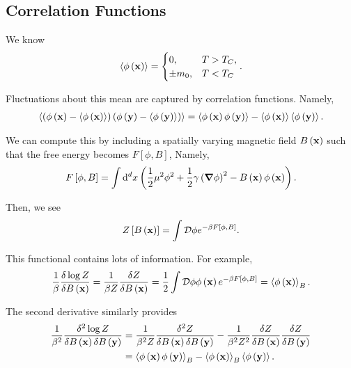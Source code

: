 
\subsection{Correlation Functions}

We know
\begin{align}
    \left<\phi \left( \vb{x} \right)  \right> = \begin{cases}
        0, & T > T_C, \\
        \pm m_0, & T < T_C
    \end{cases}
.\end{align}

Fluctuations about this mean are captured by correlation functions. Namely,
\begin{align}
    \left<\left( \phi \left( \vb{x} \right) - \left<\phi \left( \vb{x} \right)  \right> \right) \left( \phi \left( \vb{y} \right) - \left<\phi \left( \vb{y} \right)  \right> \right)   \right> = \left<\phi \left( \vb{x} \right) \phi \left( \vb{y} \right)  \right> - \left<\phi \left( \vb{x} \right)   \right> \left<\phi \left( \vb{y} \right)  \right>
.\end{align}

We can compute this by including a spatially varying magnetic field $B\left( \vb{x} \right) $ such that the free energy becomes $F \left[ \phi,B \right] $, Namely,
\begin{align}
    F \left[ \phi ,B \right] = \int \dd{^{d}x} \left( \frac{1}{2}\mu^2 \phi^2 + \frac{1}{2} \gamma \left( \grad \phi \right)^2 - B \left( \vb{x} \right) \phi \left( \vb{x} \right)  \right) 
.\end{align}

Then, we see
\begin{align}
    Z \left[ B \left( \vb{x} \right)  \right] = \int \mathcal{D} \phi e^{-\beta F \left[ \phi , B \right] }
.\end{align}

This functional contains lots of information. For example,
\begin{align}
    \frac{1}{\beta} \fdv{\log Z}{B \left( \vb{x} \right) } = \frac{1}{\beta Z} \fdv{Z}{B\left( \vb{x} \right) } = \frac{1}{2} \int \mathcal{D} \phi \phi \left( \vb{x} \right) e^{-\beta F \left[ \phi, B \right] } = \left<\phi \left( \vb{x} \right)  \right>_B
.\end{align}

The second derivative similarly provides
\begin{align}
    \frac{1}{\beta^2} \frac{\delta^2 \log Z}{\delta B\left( \vb{x} \right) \delta B\left( \vb{y} \right) } &= \frac{1}{\beta^2 Z} \frac{\delta^2Z}{\delta B \left( \vb{x} \right) \delta B \left( \vb{y} \right) } - \frac{1}{\beta^2 Z^2} \fdv{Z}{B \left( \vb{x} \right) } \fdv{Z}{B \left( \vb{y} \right) } \\
    &= \left<\phi \left( \vb{x} \right) \phi \left( \vb{y} \right)  \right>_B - \left<\phi \left( \vb{x} \right)  \right>_B \left<\phi \left( \vb{y} \right)  \right> 
.\end{align}

